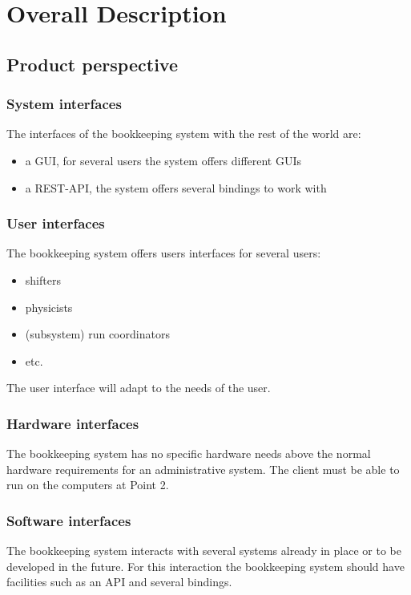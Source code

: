 \chapter{Overall Description}

\section{Product perspective}

\subsection{System interfaces}
The interfaces of the bookkeeping system with the rest of the world are:
\begin{itemize}
  \item a GUI, for several users the system offers different GUIs
  \item a REST-API, the system offers several bindings to work with
\end{itemize}

\subsection{User interfaces}
The bookkeeping system offers users interfaces for several users:
\begin{itemize}
  \item shifters
  \item physicists
  \item (subsystem) run coordinators
  \item etc.
\end{itemize}
The user interface will adapt to the needs of the user.

\subsection{Hardware interfaces}
The bookkeeping system has no specific hardware needs above the normal hardware requirements for an administrative system. The client must be able to run on the computers at Point 2.

\subsection{Software interfaces}
The bookkeeping system interacts with several systems already in place or to be developed in the future. For this interaction the bookkeeping system should have facilities such as an API and several bindings.


